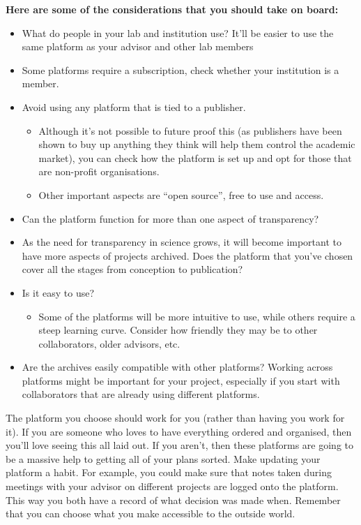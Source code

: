 \documentclass[
]{krantz}
\providecommand{\tightlist}{%
  \setlength{\itemsep}{0pt}\setlength{\parskip}{0pt}}
\begin{document}
\textbf{Here are some of the considerations that you should take on board:}

\begin{itemize}
\tightlist
\item
  What do people in your lab and institution use? It'll be easier to use the same platform as your advisor and other lab members
\item
  Some platforms require a subscription, check whether your institution is a member.
\item
  Avoid using any platform that is tied to a publisher.

  \begin{itemize}
  \tightlist
  \item
    Although it's not possible to future proof this (as publishers have been shown to buy up anything they think will help them control the academic market), you can check how the platform is set up and opt for those that are non-profit organisations.
  \item
    Other important aspects are ``open source'', free to use and access.
  \end{itemize}
\item
  Can the platform function for more than one aspect of transparency?
\item
  As the need for transparency in science grows, it will become important to have more aspects of projects archived. Does the platform that you've chosen cover all the stages from conception to publication?
\item
  Is it easy to use?

  \begin{itemize}
  \tightlist
  \item
    Some of the platforms will be more intuitive to use, while others require a steep learning curve. Consider how friendly they may be to other collaborators, older advisors, etc.
  \end{itemize}
\item
  Are the archives easily compatible with other platforms?
  Working across platforms might be important for your project, especially if you start with collaborators that are already using different platforms.
\end{itemize}

The platform you choose should work for you (rather than having you work for it). If you are someone who loves to have everything ordered and organised, then you'll love seeing this all laid out. If you aren't, then these platforms are going to be a massive help to getting all of your plans sorted. Make updating your platform a habit. For example, you could make sure that notes taken during meetings with your advisor on different projects are logged onto the platform. This way you both have a record of what decision was made when. Remember that you can choose what you make accessible to the outside world.
\end{document}
